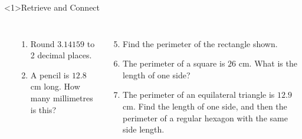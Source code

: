 \documentclass{beamer}
\newcommand{\ablank}[1]{%
  \alt<2>{\textcolor{red}{#1}}{\underline{\phantom{#1}}}%
}
\newcommand{\ashow}[1]{\uncover<2->{\textcolor{red}{\small #1}}}
\newcommand{\ashowq}[1]{\alt<2->{\textcolor{red}{\small #1}}{?}}
\begin{document}
\begin{frame}<1>{Retrieve and Connect}


\begin{columns}

\begin{center}
\end{center}

\small
\begin{enumerate}
  \item Round $3.14159$ to 2 decimal places. \ashow{3.14}
  \item A pencil is $12.8$ cm long. How many millimetres is this? \ablank{128 mm}
\end{enumerate}

\begin{enumerate}
  \setcounter{enumi}{4}
  \item Find the perimeter of the rectangle shown. \ashow{25.4 cm}
  \item The perimeter of a square is $26$ cm. What is the length of one side? \ashow{6.5 cm}
  \item  The perimeter of an equilateral triangle is $12.9$ cm. 
    Find the length of one side, and then the perimeter of a regular hexagon with the same side length. \ashow{$4.3$ cm; hexagon: $25.8$ cm}
\end{enumerate}

\end{columns}
\end{frame}
\end{document}
